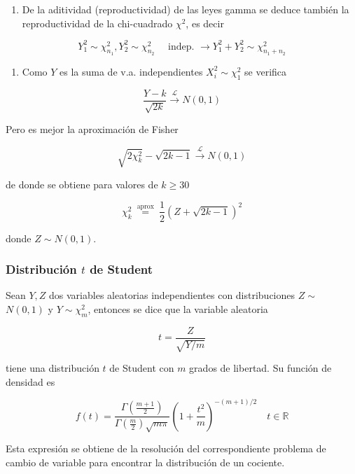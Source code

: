 \documentclass[
]{article}
\providecommand{\tightlist}{%
  \setlength{\itemsep}{0pt}\setlength{\parskip}{0pt}}
\begin{document}
\begin{enumerate}
\def\labelenumi{\arabic{enumi}.}
\setcounter{enumi}{1}
\tightlist
\item
  De la aditividad (reproductividad) de las leyes gamma se deduce también la reproductividad de la chi-cuadrado \(\chi^{2}\), es decir
\end{enumerate}

\[
Y_{1}^{2} \sim \chi_{n_{1}}^{2}, Y_{2}^{2} \sim \chi_{n_{2}}^{2} \quad \text { indep. } \longrightarrow Y_{1}^{2}+Y_{2}^{2} \sim \chi_{n_{1}+n_{2}}^{2}
\]

\begin{enumerate}
\def\labelenumi{\arabic{enumi}.}
\setcounter{enumi}{2}
\tightlist
\item
  Como \(Y\) es la suma de v.a. independientes \(X_{i}^{2} \sim \chi_{1}^{2}\) se verifica
\end{enumerate}

\[
\frac{Y-k}{\sqrt{2 k}} \xrightarrow{\mathcal{L}} N(0,1)
\]

Pero es mejor la aproximación de Fisher

\[
\sqrt{2 \chi_{k}^{2}}-\sqrt{2 k-1} \xrightarrow{\mathcal{L}} N(0,1)
\]

de donde se obtiene para valores de \(k \geq 30\)

\[
\chi_{k}^{2} \stackrel{\text { aprox }}{=} \frac{1}{2}(Z+\sqrt{2 k-1})^{2}
\]

donde \(Z \sim N(0,1)\).

\subsubsection{\texorpdfstring{Distribución \(t\) de Student}{Distribución t de Student}}\label{distribuciuxf3n-t-de-student}

Sean \(Y, Z\) dos variables aleatorias independientes con distribuciones \(Z \sim\) \(N(0,1)\) y \(Y \sim \chi_{m}^{2}\), entonces se dice que la variable aleatoria

\[
t=\frac{Z}{\sqrt{Y / m}}
\]

tiene una distribución \(t\) de Student con \(m\) grados de libertad.
Su función de densidad es

\[
f(t)=\frac{\Gamma\left(\frac{m+1}{2}\right)}{\Gamma\left(\frac{m}{2}\right) \sqrt{m \pi}}\left(1+\frac{t^{2}}{m}\right)^{-(m+1) / 2} \quad t \in \mathbb{R}
\]

Esta expresión se obtiene de la resolución del correspondiente problema de cambio de variable para encontrar la distribución de un cociente.
\end{document}
